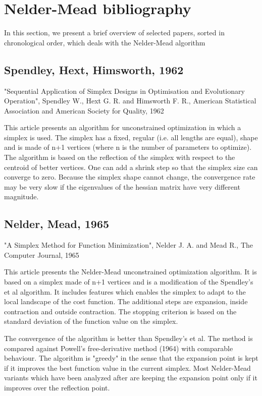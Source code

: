 \chapter{Nelder-Mead bibliography}

In this section, we present a brief overview of selected 
papers, sorted in chronological order, which deals with 
the Nelder-Mead algorithm

\section{Spendley, Hext, Himsworth, 1962}

"Sequential Application of Simplex Designs in Optimisation and Evolutionary Operation", 
Spendley W., Hext G. R. and Himsworth F. R., 
American Statistical Association and American Society for Quality, 1962

This article \cite{Spendley1962} presents an algorithm for unconstrained optimization in 
which a simplex is used. The simplex has a fixed, regular (i.e. all 
lengths are equal), shape and is made of n+1 vertices (where n is the 
number of parameters to optimize). The algorithm is based on the 
reflection of the simplex with respect to the centroid of better 
vertices. One can add a shrink step so that the simplex size can converge 
to zero. Because the simplex shape cannot change, the convergence rate 
may be very slow if the eigenvalues of the hessian matrix have very 
different magnitude.

\section{Nelder, Mead, 1965}

"A Simplex Method for Function Minimization", 
Nelder J. A.  and Mead R., 
The Computer Journal, 1965

This article \cite{citeulike:3009487} presents the Nelder-Mead unconstrained optimization 
algorithm. It is based on a simplex made of n+1 vertices and is a 
modification of the Spendley's et al algorithm. It includes features 
which enables the simplex to adapt to the local landscape of the cost 
function. The additional steps are expansion, inside contraction and 
outside contraction. The stopping criterion is based on the standard 
deviation of the function value on the simplex.

The convergence of the algorithm is better than Spendley's et al. The 
method is compared against Powell's free-derivative method (1964) with 
comparable behaviour. The algorithm is "greedy" in the sense that the 
expansion point is kept if it improves the best function value in the 
current simplex. Most Nelder-Mead variants which have been analyzed 
after are keeping the expansion point only if it improves over the 
reflection point.

